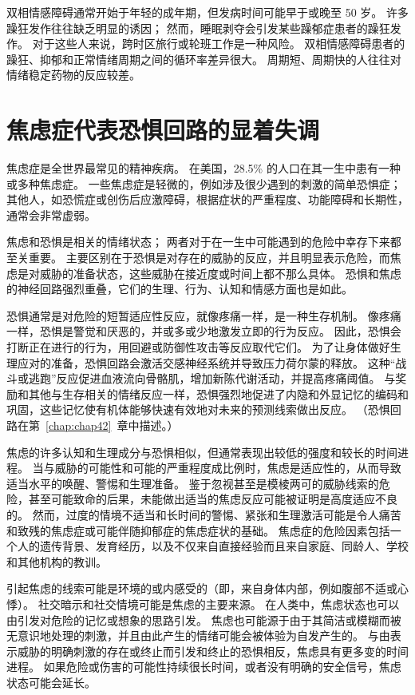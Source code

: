 双相情感障碍通常开始于年轻的成年期，但发病时间可能早于或晚至 50 岁。
许多躁狂发作往往缺乏明显的诱因；
然而，睡眠剥夺会引发某些躁郁症患者的躁狂发作。
对于这些人来说，跨时区旅行或轮班工作是一种风险。
双相情感障碍患者的躁狂、抑郁和正常情绪周期之间的循环率差异很大。
周期短、周期快的人往往对情绪稳定药物的反应较差。



\section{焦虑症代表恐惧回路的显着失调}

焦虑症是全世界最常见的精神疾病。
在美国，28.5\% 的人口在其一生中患有一种或多种焦虑症。
一些焦虑症是轻微的，例如涉及很少遇到的刺激的简单恐惧症；
其他人，如恐慌症或创伤后应激障碍，根据症状的严重程度、功能障碍和长期性，通常会非常虚弱。


焦虑和恐惧是相关的情绪状态；
两者对于在一生中可能遇到的危险中幸存下来都至关重要。
主要区别在于恐惧是对存在的威胁的反应，并且明显表示危险，而焦虑是对威胁的准备状态，这些威胁在接近度或时间上都不那么具体。
恐惧和焦虑的神经回路强烈重叠，它们的生理、行为、认知和情感方面也是如此。


恐惧通常是对危险的短暂适应性反应，就像疼痛一样，是一种生存机制。
像疼痛一样，恐惧是警觉和厌恶的，并或多或少地激发立即的行为反应。
因此，恐惧会打断正在进行的行为，用回避或防御性攻击等反应取代它们。
为了让身体做好生理应对的准备，恐惧回路会激活交感神经系统并导致压力荷尔蒙的释放。
这种“战斗或逃跑”反应促进血液流向骨骼肌，增加新陈代谢活动，并提高疼痛阈值。
与奖励和其他与生存相关的情绪反应一样，恐惧强烈地促进了内隐和外显记忆的编码和巩固，这些记忆使有机体能够快速有效地对未来的预测线索做出反应。 
（恐惧回路在第~\ref{chap:chap42}~章中描述。）


焦虑的许多认知和生理成分与恐惧相似，但通常表现出较低的强度和较长的时间进程。
当与威胁的可能性和可能的严重程度成比例时，焦虑是适应性的，从而导致适当水平的唤醒、警惕和生理准备。
鉴于忽视甚至是模棱两可的威胁线索的危险，甚至可能致命的后果，未能做出适当的焦虑反应可能被证明是高度适应不良的。
然而，过度的情境不适当和长时间的警惕、紧张和生理激活可能是令人痛苦和致残的焦虑症或可能伴随抑郁症的焦虑症状的基础。
焦虑症的危险因素包括一个人的遗传背景、发育经历，以及不仅来自直接经验而且来自家庭、同龄人、学校和其他机构的教训。


引起焦虑的线索可能是环境的或内感受的（即，来自身体内部，例如腹部不适或心悸）。
社交暗示和社交情境可能是焦虑的主要来源。
在人类中，焦虑状态也可以由引发对危险的记忆或想象的思路引发。
焦虑也可能源于由于其简洁或模糊而被无意识地处理的刺激，并且由此产生的情绪可能会被体验为自发产生的。
与由表示威胁的明确刺激的存在或终止而引发和终止的恐惧相反，焦虑具有更多变的时间进程。
如果危险或伤害的可能性持续很长时间，或者没有明确的安全信号，焦虑状态可能会延长。


